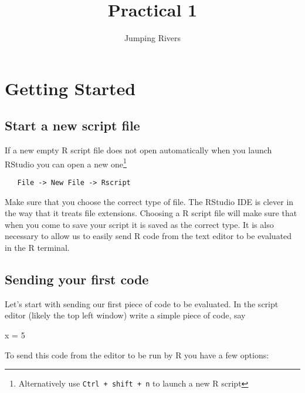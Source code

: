 \documentclass[]{tufte-handout}
\title{Practical 1}
\author{Jumping Rivers}
\date{}
\newenvironment{Shaded}{}{}
\newcommand{\DecValTok}[1]{\textcolor[rgb]{0.25,0.63,0.44}{#1}}
\newcommand{\NormalTok}[1]{#1}
\newcommand{\StringTok}[1]{\textcolor[rgb]{0.25,0.44,0.63}{#1}}
\begin{document}
\maketitle




\hypertarget{getting-started}{%
\section{Getting Started}\label{getting-started}}

\hypertarget{start-a-new-script-file}{%
\subsection{Start a new script file}\label{start-a-new-script-file}}

If a new empty R script file does not open automatically when you launch
RStudio you can open a new one\footnote{Alternatively use
  \texttt{Ctrl\ +\ shift\ +\ n} to launch a new R script}

\begin{verbatim}
   File -> New File -> Rscript
\end{verbatim}

\noindent Make sure that you choose the correct type of file. The
RStudio IDE is clever in the way that it treats file extensions.
Choosing a R script file will make sure that when you come to save your
script it is saved as the correct type. It is also necessary to allow us
to easily send R code from the text editor to be evaluated in the R
terminal.

\hypertarget{sending-your-first-code}{%
\subsection{Sending your first code}\label{sending-your-first-code}}

Let's start with sending our first piece of code to be evaluated. In the
script editor (likely the top left window) write a simple piece of code,
say

\begin{Shaded}
\begin{Highlighting}[]
\NormalTok{x =}\StringTok{ }\DecValTok{5}
\end{Highlighting}
\end{Shaded}

\noindent To send this code from the editor to be run by R you have a
few options:
\end{document}
